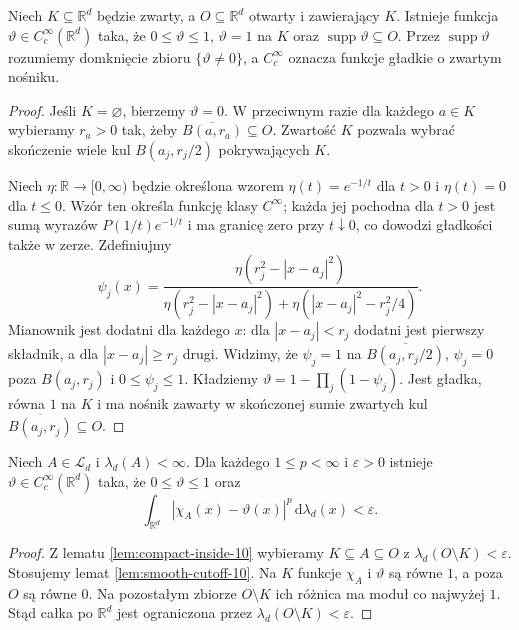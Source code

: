 \begin{lemat}
\label{lem:smooth-cutoff-10}
Niech $K\subseteq\mathbb R^d$ będzie zwarty,
a $O\subseteq\mathbb R^d$ otwarty i zawierający $K$.
Istnieje funkcja $\vartheta\in C_c^\infty(\mathbb R^d)$
taka, że $0\le\vartheta\le1$, $\vartheta=1$ na $K$
oraz $\operatorname{supp}\vartheta\subseteq O$.
Przez $\operatorname{supp}\vartheta$ rozumiemy domknięcie
zbioru $\{\vartheta\ne0\}$, a $C_c^\infty$ oznacza
funkcje gładkie o zwartym nośniku.
\end{lemat}
\begin{proof}
Jeśli $K=\varnothing$, bierzemy $\vartheta=0$.
W przeciwnym razie dla każdego $a\in K$ wybieramy
$r_a>0$ tak, żeby $\overline{B(a,r_a)}\subseteq O$.
Zwartość $K$ pozwala wybrać skończenie wiele
kul $B(a_j,r_j/2)$ pokrywających $K$.

Niech $\eta:\mathbb R\to[0,\infty)$ będzie określona
wzorem $\eta(t)=e^{-1/t}$ dla $t>0$ i $\eta(t)=0$
dla $t\le0$. Wzór ten określa funkcję klasy
$C^\infty$; każda jej pochodna dla $t>0$ jest
sumą wyrazów $P(1/t)e^{-1/t}$ i ma granicę zero
przy $t\downarrow0$, co dowodzi gładkości także
w zerze. Zdefiniujmy
\[
\psi_j(x)=
\frac{\eta(r_j^2-|x-a_j|^2)}
{\eta(r_j^2-|x-a_j|^2)+
 \eta(|x-a_j|^2-r_j^2/4)}.
\]
Mianownik jest dodatni dla każdego $x$:
dla $|x-a_j|<r_j$ dodatni jest pierwszy składnik,
a dla $|x-a_j|\ge r_j$ drugi. Widzimy, że
$\psi_j=1$ na $\overline{B(a_j,r_j/2)}$,
$\psi_j=0$ poza $B(a_j,r_j)$ i
$0\le\psi_j\le1$.
Kładziemy $\vartheta=1-\prod_j(1-\psi_j)$.
Jest gładka, równa $1$ na $K$ i ma nośnik zawarty
w skończonej sumie zwartych kul
$\overline{B(a_j,r_j)}\subseteq O$.
\end{proof}

\begin{wniosek}
\label{cor:indicator-smooth-10}
Niech $A\in\mathcal L_d$ i $\lambda_d(A)<\infty$.
Dla każdego $1\le p<\infty$ i $\varepsilon>0$
istnieje $\vartheta\in C_c^\infty(\mathbb R^d)$ taka,
że $0\le\vartheta\le1$ oraz
\begin{equation}\label{eq:indicator-smooth-10}
\int_{\mathbb R^d}|\chi_A(x)-\vartheta(x)|^p
\,\mathrm d\lambda_d(x)<\varepsilon.
\end{equation}
\end{wniosek}
\begin{proof}
Z lematu \ref{lem:compact-inside-10} wybieramy
$K\subseteq A\subseteq O$ z
$\lambda_d(O\setminus K)<\varepsilon$.
Stosujemy lemat \ref{lem:smooth-cutoff-10}.
Na $K$ funkcje $\chi_A$ i $\vartheta$ są równe $1$,
a poza $O$ są równe $0$. Na pozostałym zbiorze
$O\setminus K$ ich różnica ma moduł co najwyżej $1$.
Stąd całka po $\mathbb R^d$ jest ograniczona przez
$\lambda_d(O\setminus K)<\varepsilon$.
\end{proof}

